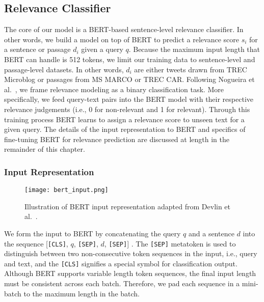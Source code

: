 \subsection{Relevance Classifier}

The core of our model is a BERT-based sentence-level relevance classifier.
In other words, we build a model on top of BERT to predict a relevance score $ s_i $ for a sentence or passage $ d_i $ given a query $ q $.
Because the maximum input length that BERT can handle is 512 tokens, we limit our training data to sentence-level and passage-level datasets.
In other words, $ d_i $ are either tweets drawn from TREC Microblog or passages from MS MARCO or TREC CAR.
Following Nogueira et al.~\cite{nogueira2019passage}, we frame relevance modeling as a binary classification task.
More specifically, we feed query-text pairs into the BERT model with their respective relevance judgements (i.e., 0 for non-relevant and 1 for relevant).
Through this training process BERT learns to assign a relevance score to unseen text for a given query.
The details of the input representation to BERT and specifics of fine-tuning BERT for relevance prediction are discussed at length in the remainder of this chapter.

\subsubsection{Input Representation}


\begin{figure}[b!]
\centering
  \texttt{[image: bert\_input.png]}
\caption{Illustration of BERT input representation adapted from Devlin et al.~\cite{devlin2018bert}.}
\label{fig:bert_input}
\end{figure}

We form the input to BERT by concatenating the query $ q $ and a sentence $ d $ into the sequence [\texttt{[CLS]}, $q$, \texttt{[SEP]}, $d$, \texttt{[SEP]}] .
The \texttt{[SEP]} metatoken is used to distinguish between two non-consecutive token sequences in the input, i.e., query and text, and the \texttt{[CLS]} signifies a special symbol for classification output.
Although BERT supports variable length token sequences, the final input length must be consistent across each batch.
Therefore, we pad each sequence in a mini-batch to the maximum length in the batch.

